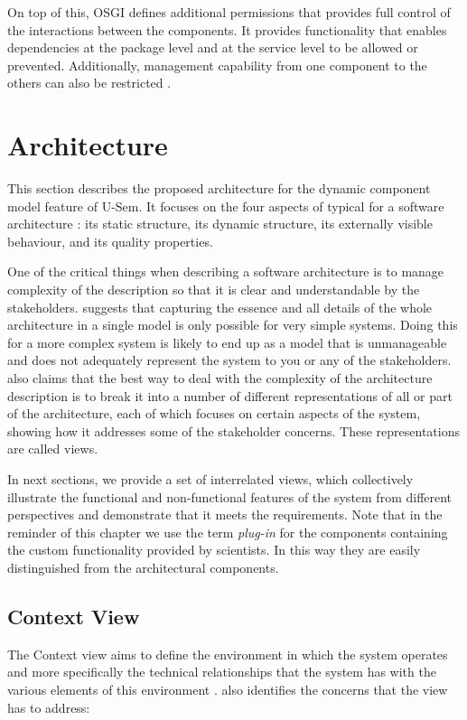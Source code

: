 On top of this, OSGI defines additional permissions that provides full control of the interactions between the components. It provides functionality that enables dependencies at the package level and at the service level to be allowed or prevented. Additionally, management capability from one component to the others can also be restricted \cite{Parrend}.


\section{Architecture}
\label{sec:architecturePlugin}

This section describes the proposed architecture for the dynamic component model feature of U-Sem. It focuses on the four aspects of typical for a software architecture \cite{Rozanski}: its static structure, its dynamic structure, its externally visible behaviour, and its quality properties.

One of the critical things when describing a software architecture is to manage complexity of the description so that it is clear and understandable by the stakeholders. \cite{Rozanski} suggests that capturing the essence and all details of the whole architecture in a single model is only possible for very simple systems. Doing this for a more complex system is likely to end up as a model that is unmanageable and does not adequately represent the system to you or any of the stakeholders. \cite{Rozanski} also claims that the best way to deal with the complexity of the architecture description is to break it into a number of different representations of all or part of the architecture, each of which focuses on certain aspects of the system, showing how it addresses some of the stakeholder concerns. These representations are called views.

In next sections, we provide a set of interrelated views, which collectively illustrate the functional and non-functional features of the system from different perspectives and demonstrate that it meets the requirements. Note that in the reminder of this chapter we use the term \textit{plug-in} for the components containing the custom functionality provided by scientists. In this way they are easily distinguished from the architectural components. 

\subsection{Context View}

The Context view aims to define the environment in which the system operates and more specifically the technical relationships that the system has with the various elements of this environment \cite{Woods}. \cite{Woods} also identifies the concerns that the view has to address:

